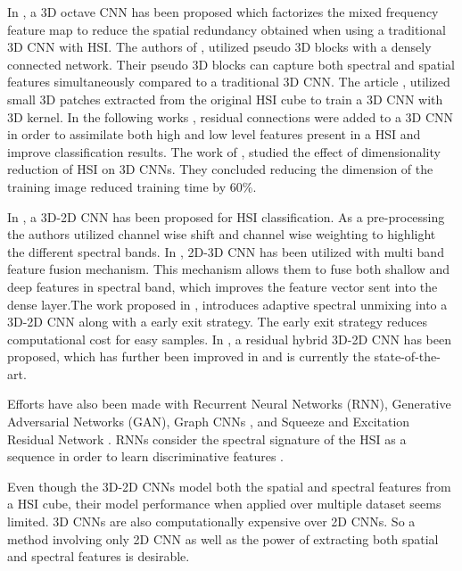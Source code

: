 \documentclass[journal]{IEEEtran}
\begin{document}
In \cite{xu2020csa}, a 3D octave CNN has been proposed which factorizes the mixed frequency feature map to reduce the spatial redundancy obtained when using a traditional 3D CNN with HSI. The authors of \cite{8851917}, utilized pseudo 3D blocks with a densely connected network. Their pseudo 3D blocks can capture both spectral and spatial features simultaneously compared to a traditional 3D CNN. The article \cite{ahmad2020fast}, utilized small 3D patches extracted from the original HSI cube to train a 3D CNN with 3D kernel. In the following works \cite{8061020}, residual connections were added to a 3D CNN in order to assimilate both high and low level features present in a HSI and improve classification results. The work of \cite{10.1007/978-3-030-14118-9_2}, studied the effect of dimensionality reduction of HSI on 3D CNNs. They concluded reducing the dimension of the training image reduced training time by 60\%. 

In \cite{9103280}, a 3D-2D CNN has been proposed for HSI classification. As a pre-processing the authors utilized channel wise shift and channel wise weighting to highlight the different spectral bands. In \cite{9200676}, 2D-3D CNN has been utilized with multi band feature fusion mechanism. This mechanism allows them to fuse both shallow and deep features in spectral band, which improves the feature vector sent into the dense layer.The work proposed in \cite{fang2020combining}, introduces adaptive spectral unmixing into a 3D-2D CNN along with a early exit strategy. The early exit strategy reduces computational cost for easy samples. In \cite{feng2019learning}, a residual hybrid 3D-2D CNN has been proposed, which has further been improved in \cite{8736016} and is currently the state-of-the-art.

Efforts have also been made with Recurrent Neural Networks (RNN), Generative Adversarial Networks (GAN), Graph CNNs \cite{9091940}, and Squeeze and Excitation Residual Network \cite{wang2019spatial}. RNNs consider the spectral signature of the HSI as a sequence in order to learn discriminative features \cite{8662780}. 

Even though the 3D-2D CNNs model both the spatial and spectral features from a HSI cube, their model performance when applied over multiple dataset seems limited. 3D CNNs are also computationally expensive over 2D CNNs. So a method involving only 2D CNN as well as the power of extracting both spatial and spectral features is desirable. 
\end{document}
